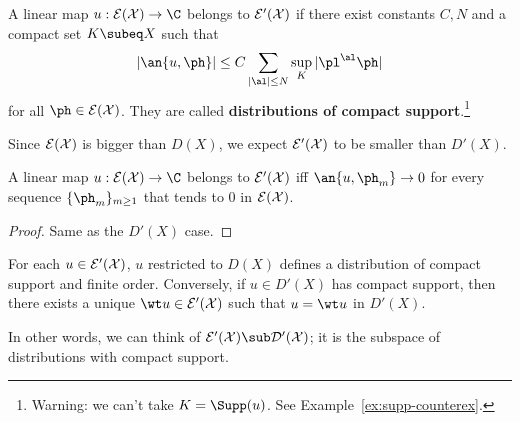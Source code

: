 \begin{df}
A linear map $u:\cal E(X)\to \C$ belongs to $\cal E'(X)$ if there exist constants $C,N$ and a compact set $K\subeq X$ such that 
\[
|\an{u,\ph}|\le C\sum_{|\al|\le N} \sup_K|\pl^{\al}\ph|
\]
for all $\ph\in \cal E(X)$. They are called \textbf{distributions of compact support}.\footnote{Warning: we can't take $K=\Supp(u)$. See Example~\ref{ex:supp-counterex}.}
\end{df} 
Since $\cal E(X)$ is bigger than $D(X)$, we expect $\cal E'(X)$ to be smaller than $D'(X)$.
\begin{lem}
A linear map $u:\cal E(X)\to \C$ belongs to $\cal E'(X)$ iff $\an{u,\ph_m}\to 0$ for every sequence $\{\ph_m\}_{m\ge 1}$ that tends to 0 in $\cal E(X)$. 
\end{lem}
\begin{proof}
Same as the $D'(X)$ case.
\end{proof}
\begin{lem}
For each $u\in \cal E'(X)$, $u$ restricted to $D(X)$ defines a distribution of compact support and finite order. Conversely, if $u\in D'(X)$ has compact support, then there exists a unique $\wt u\in \cal E'(X)$ such that $u=\wt u$ in $D'(X)$. 
\end{lem}
In other words, we can think of $\cal E'(X)\sub D'(X)$; it is the subspace of distributions with compact support.
